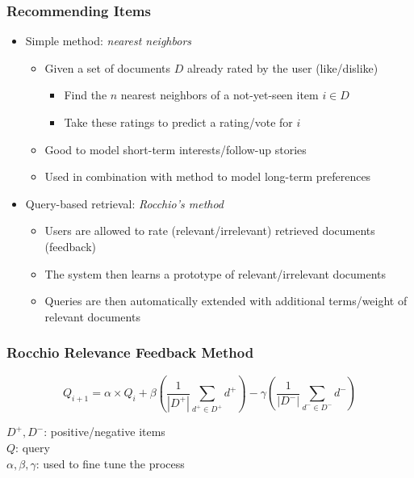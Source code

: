 \documentclass{beamer}
\begin{document}
\begin{frame}
    \frametitle{Recommending Items}
    \begin{itemize}
    \item Simple method: \emph{nearest neighbors}
        \begin{itemize}
        \item Given a set of documents $D$ already rated by the user
            (like/dislike)
            \begin{itemize}
            \item Find the $n$ nearest neighbors of a not-yet-seen item $i \in
                D$
            \item Take these ratings to predict a rating/vote for $i$
            \end{itemize}
        \item Good to model short-term interests/follow-up stories
        \item Used in combination with method to model long-term preferences
        \end{itemize}
    \item Query-based retrieval: \emph{Rocchio's method}
        \begin{itemize}
        \item Users are allowed to rate (relevant/irrelevant) retrieved
            documents (feedback)
        \item The system then learns a prototype of relevant/irrelevant
            documents
        \item Queries are then automatically extended with additional
            terms/weight of relevant documents
        \end{itemize}
    \end{itemize}
\end{frame}

\begin{frame}
    \frametitle{Rocchio Relevance Feedback Method}
    \begin{block}{}
        \begin{displaymath}
            Q_{i+1} = \alpha \times Q_i + \beta (\frac{1}{|D^+|}\sum_{d^+\in
              D^+}d^+) - \gamma (\frac{1}{|D^-|}\sum_{d^-\in D^-}d^-)
        \end{displaymath}
        \centering
        \begin{minipage}{0.7\linewidth}
            $D^+, D^-$: positive/negative items\\
            $Q$: query\\
            $\alpha, \beta, \gamma$: used to fine tune the process
        \end{minipage}
    \end{block}
\end{frame}
\end{document}
